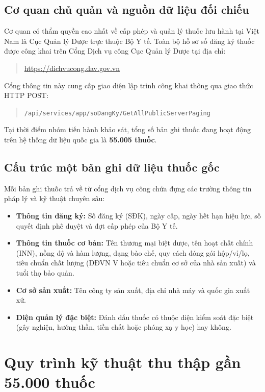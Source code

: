 \documentclass[12pt,a4paper]{article}
\begin{document}
\subsection{Cơ quan chủ quản và nguồn dữ liệu đối chiếu}
Cơ quan có thẩm quyền cao nhất về cấp phép và quản lý thuốc lưu hành tại Việt Nam là Cục Quản lý Dược trực thuộc Bộ Y tế. Toàn bộ hồ sơ số đăng ký thuốc được công khai trên Cổng Dịch vụ công Cục Quản lý Dược tại địa chỉ:
\begin{quote}
    \url{https://dichvucong.dav.gov.vn}
\end{quote}

Cổng thông tin này cung cấp giao diện lập trình công khai thông qua giao thức HTTP POST:
\begin{quote}
    \texttt{/api/services/app/soDangKy/GetAllPublicServerPaging}
\end{quote}

Tại thời điểm nhóm tiến hành khảo sát, tổng số bản ghi thuốc đang hoạt động trên hệ thống dữ liệu quốc gia là \textbf{55.005 thuốc}.

\subsection{Cấu trúc một bản ghi dữ liệu thuốc gốc}
Mỗi bản ghi thuốc trả về từ cổng dịch vụ công chứa đựng các trường thông tin pháp lý và kỹ thuật chuyên sâu:
\begin{itemize}[leftmargin=1.5em]
    \item \textbf{Thông tin đăng ký:} Số đăng ký (SĐK), ngày cấp, ngày hết hạn hiệu lực, số quyết định phê duyệt và đợt cấp phép của Bộ Y tế.
    \item \textbf{Thông tin thuốc cơ bản:} Tên thương mại biệt dược, tên hoạt chất chính (INN), nồng độ và hàm lượng, dạng bào chế, quy cách đóng gói hộp/vỉ/lọ, tiêu chuẩn chất lượng (DĐVN V hoặc tiêu chuẩn cơ sở của nhà sản xuất) và tuổi thọ bảo quản.
    \item \textbf{Cơ sở sản xuất:} Tên công ty sản xuất, địa chỉ nhà máy và quốc gia xuất xứ.
    \item \textbf{Diện quản lý đặc biệt:} Đánh dấu thuốc có thuộc diện kiểm soát đặc biệt (gây nghiện, hướng thần, tiền chất hoặc phóng xạ y học) hay không.
\end{itemize}

\section{Quy trình kỹ thuật thu thập gần 55.000 thuốc}
\end{document}
